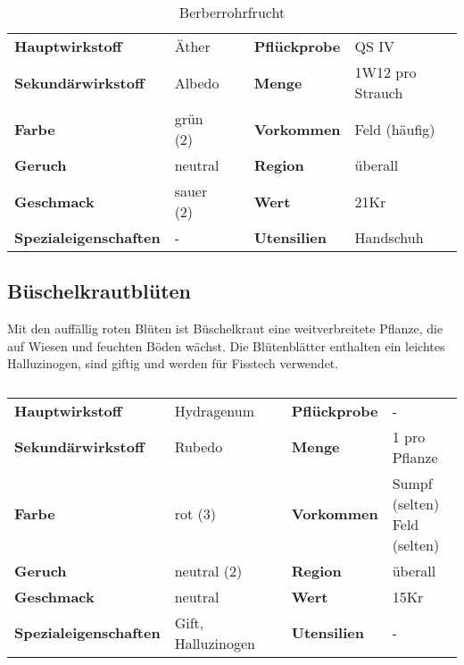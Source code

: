 \begin{table}[h]
\begin{center}
\begin{tabular}{|l|l|p{1cm}|l|l|}
	\cline{1-2} \cline{4-5}
	\textbf{Hauptwirkstoff} & Äther && \textbf{Pflückprobe} & QS IV \\ \cline{1-2} \cline{4-5}
	\textbf{Sekundärwirkstoff} & Albedo && \textbf{Menge} & 1W12 pro Strauch \\ \cline{1-2} \cline{4-5}
	\textbf{Farbe} & grün (2) && \textbf{Vorkommen} & Feld (häufig) \\ \cline{1-2} \cline{4-5}
	\textbf{Geruch} & neutral && \textbf{Region} & überall \\ \cline{1-2} \cline{4-5}
	\textbf{Geschmack} & sauer (2) && \textbf{Wert} & 21Kr \\ \cline{1-2} \cline{4-5}
	\textbf{Spezialeigenschaften} & - && \textbf{Utensilien} & Handschuh \\ \cline{1-2} \cline{4-5}
\end{tabular}
\end{center}
\caption{Berberrohrfrucht}
\label{tab:berberrohrfrucht}
\end{table}


\subsection{Büschelkrautblüten}
Mit den auffällig roten Blüten ist Büschelkraut eine weitverbreitete Pflanze, die auf Wiesen und feuchten Böden wächst. Die Blütenblätter enthalten ein leichtes Halluzinogen, sind giftig und werden für Fisstech verwendet. 

\begin{table}[h] 
\begin{center} 
\begin{tabular}{|l|l|p{1cm}|l|l|} 
  	\cline{1-2} \cline{4-5} 
  	\textbf{Hauptwirkstoff} & Hydragenum && \textbf{Pflückprobe} & - \\ \cline{1-2} \cline{4-5} 
  	\textbf{Sekundärwirkstoff} & Rubedo && \textbf{Menge} & 1 pro Pflanze \\ \cline{1-2} \cline{4-5} 
  	\textbf{Farbe} & rot (3) && \textbf{Vorkommen} & \brcell{Sumpf (selten)\\Feld (selten)} \\ \cline{1-2} \cline{4-5} 
  	\textbf{Geruch} & neutral (2) && \textbf{Region} & überall \\ \cline{1-2} \cline{4-5} 
  	\textbf{Geschmack} & neutral && \textbf{Wert} & 15Kr \\ \cline{1-2} \cline{4-5} 
  	\textbf{Spezialeigenschaften} & Gift, Halluzinogen && \textbf{Utensilien} & - \\ \cline{1-2} \cline{4-5} 
\end{tabular} 
\end{center} 
\caption{} 
\label{tab:bueschelkrautblueten} 
\end{table}


